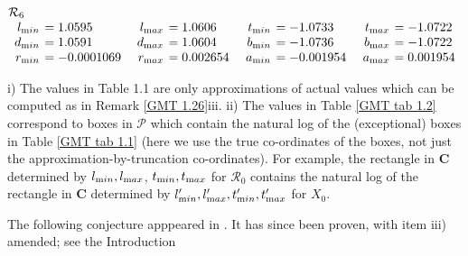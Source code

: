 \begin{table}
\begin{small}
$$\begin{array}{rlrlrlrl}
\noalign{\noindent  $\mathcal {R}_6$}
\noalign{\vskip2pt}
l_{\textrm min} &\hskip-6pt =  1.0595&\enspace    l_{\textrm max} &\hskip-6pt =  1.0606&\enspace   
t_{\textrm min} &\hskip-6pt =  -1.0733&\enspace    t_{\textrm max} &\hskip-6pt =  -1.0722\\
d_{\textrm min} &\hskip-6pt =  1.0591&  d_{\textrm max}
&\hskip-6pt =  1.0604&   b_{\textrm min} &\hskip-6pt =  -1.0736&  b_{\textrm max} &\hskip-6pt =  -1.0722\\
r_{\textrm min} &\hskip-6pt =  -0.0001069& 
r_{\textrm max} &\hskip-6pt =  0.002654&   a_{\textrm min} &\hskip-6pt =  -0.001954&  a_{\textrm max} &\hskip-6pt =  0.001954\end{array}$$
\end{small}
\end{table}

\begin{remarks}\label{GMT 1.30}
i)  The values in Table 1.1 are only 
	approximations of actual values which can be computed as in Remark \ref{GMT 1.26}iii.
	ii)  The values in Table \ref{GMT tab 1.2} correspond to boxes in $\mathcal {P}$ which contain the natural log of the (exceptional) boxes in Table \ref{GMT tab 1.1} (here we use the true co-ordinates of the boxes, not just the approximation-by-truncation co-ordinates).  
For example,
 the rectangle in $\mathbf {C}$ determined by $l_{\textrm min}, l_{\textrm max}$,
$t_{\textrm min}, t_{\textrm max}$ for $\mathcal {R}_0$ contains the natural log of the rectangle in $\mathbf {C}$ determined by $l'_{\textrm min},
l'_{\textrm max}, t'_{\textrm min}, t'_{\textrm max}$ for $X_0$.  
\end{remarks}

The following conjecture apppeared in \cite{GMT}. It has since been proven,
with item iii) amended; see
the Introduction

